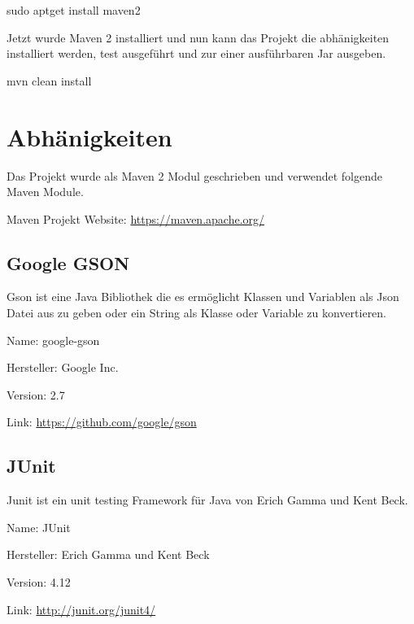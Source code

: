\documentclass[letterpaper,10pt,ngerman]{sphinxmanual}
\begin{document}
\begin{sphinxVerbatim}[commandchars=\\\{\}]
\PYGZdl{} sudo apt\PYGZhy{}get install maven2
\end{sphinxVerbatim}

Jetzt wurde Maven 2 installiert und nun kann das Projekt die abhänigkeiten installiert werden, test ausgeführt und
zur einer ausführbaren Jar ausgeben.

\begin{sphinxVerbatim}[commandchars=\\\{\}]
\PYGZdl{} mvn clean install
\end{sphinxVerbatim}

\noindent{}


\section{Abhänigkeiten}
\label{\detokenize{intro:abhanigkeiten}}
Das Projekt wurde als Maven 2 Modul geschrieben und verwendet folgende Maven Module.

Maven Projekt Website: \url{https://maven.apache.org/}


\subsection{Google GSON}
\label{\detokenize{intro:google-gson}}
Gson ist eine Java Bibliothek die es ermöglicht Klassen und Variablen als Json Datei aus zu geben oder
ein String als Klasse oder Variable zu konvertieren.

\begin{DUlineblock}{0em}
\item[] Name: google-gson
\item[] Hersteller: Google Inc.
\item[] Version: 2.7
\item[] Link: \url{https://github.com/google/gson}
\end{DUlineblock}


\subsection{JUnit}
\label{\detokenize{intro:junit}}
Junit ist ein unit testing Framework für Java von Erich Gamma und Kent Beck.

\begin{DUlineblock}{0em}
\item[] Name: JUnit
\item[] Hersteller: Erich Gamma und Kent Beck
\item[] Version: 4.12
\item[] Link: \url{http://junit.org/junit4/}
\end{DUlineblock}
\end{document}
